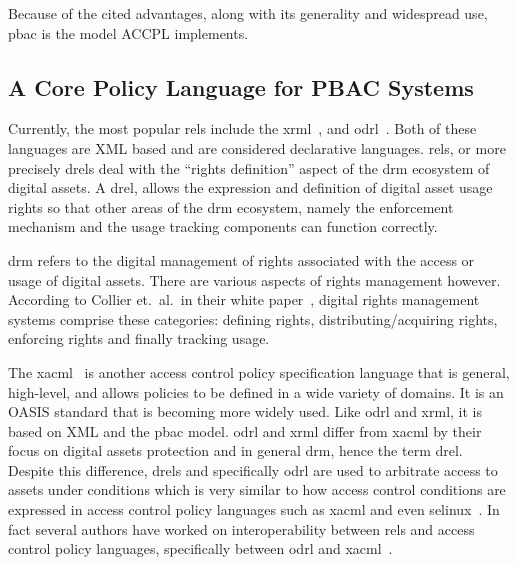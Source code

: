 \documentclass[runningheads,a4paper]{llncs}
\begin{document}
Because of the cited advantages, along with its generality and
widespread use, \ac{pbac} is the model \ac{ACCPL} implements.

\subsection{A Core Policy Language for PBAC Systems} 

Currently, the most popular \ac{rel}s include the
\ac{xrml}~\cite{Wang}, and \ac{odrl}~\cite{odrloneone}. Both of these
languages are XML based and are considered declarative
languages. 
\ac{rel}s, or more precisely \ac{drel}s deal with the ``rights
definition'' aspect of the \ac{drm} ecosystem of digital assets. 
A \ac{drel}, allows the expression and definition
of digital asset usage rights so that other areas of the \ac{drm}
ecosystem, namely the enforcement mechanism and the usage tracking
components can function correctly.

\ac{drm} refers to the digital management of rights associated with
the access or usage of digital assets. There are various aspects of
rights management however.
According to Collier et.\ al.\ in their white paper~\cite{collier},
%
digital rights management systems comprise these categories: defining
rights, distributing/acquiring rights, enforcing rights and finally
tracking usage.


The \ac{xacml}~\cite{xacml3} is another access control policy
specification language that is general, high-level, and allows
policies to be defined in a wide variety of domains.  It is an OASIS
standard that is becoming more widely used.  Like \ac{odrl} and
\ac{xrml}, it is based on XML and the \ac{pbac} model.  \ac{odrl} and
\ac{xrml} differ from \ac{xacml} by their focus on digital assets
protection and in general \ac{drm}, hence the term \ac{drel}.  Despite
this difference, \ac{drel}s and specifically \ac{odrl} are used to
arbitrate access to assets under conditions which is very similar to
how access control conditions are expressed in access control policy
languages such as \ac{xacml} and even \ac{selinux}~\cite{selinux}. In
fact several authors have worked on interoperability between \ac{rel}s
and access control policy languages, specifically between \ac{odrl}
and
\ac{xacml}~\cite{prados2005interoperability,maronas2009architecture}.
\end{document}
